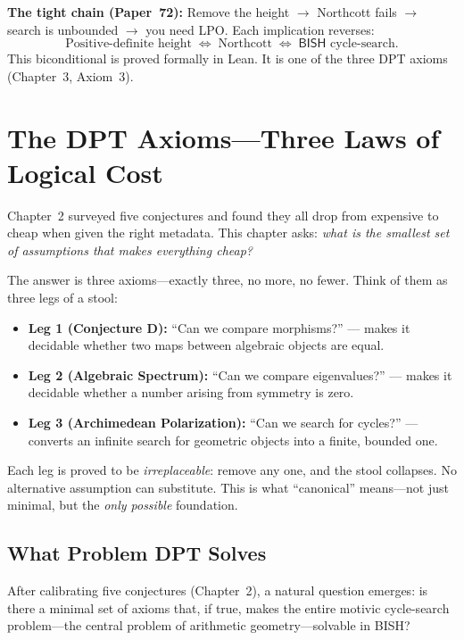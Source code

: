\documentclass[11pt,twoside,openany]{report}
\theoremstyle{remark}
\newcommand{\BISH}{\textsf{BISH}}
\newcommand{\LPO}{\textsf{LPO}}
\newcommand{\paperref}[1]{\textbf{Paper~#1}}
\begin{document}
\textbf{The tight chain (\paperref{72}):} Remove the height $\to$ Northcott fails $\to$ search is unbounded $\to$ you need \LPO. Each implication reverses:
\[
  \text{Positive-definite height} \;\Leftrightarrow\; \text{Northcott} \;\Leftrightarrow\; \BISH\text{ cycle-search}.
\]
This biconditional is proved formally in Lean. It is one of the three DPT axioms (Chapter~3, Axiom~3).


\chapter{The DPT Axioms---Three Laws of Logical Cost}

\begin{analogybox}
Chapter~2 surveyed five conjectures and found they all drop from expensive to cheap when given the right metadata. This chapter asks: \emph{what is the smallest set of assumptions that makes everything cheap?}

The answer is three axioms---exactly three, no more, no fewer. Think of them as three legs of a stool:
\begin{itemize}
  \item \textbf{Leg 1 (Conjecture D):} ``Can we compare morphisms?'' --- makes it decidable whether two maps between algebraic objects are equal.
  \item \textbf{Leg 2 (Algebraic Spectrum):} ``Can we compare eigenvalues?'' --- makes it decidable whether a number arising from symmetry is zero.
  \item \textbf{Leg 3 (Archimedean Polarization):} ``Can we search for cycles?'' --- converts an infinite search for geometric objects into a finite, bounded one.
\end{itemize}
Each leg is proved to be \emph{irreplaceable}: remove any one, and the stool collapses. No alternative assumption can substitute. This is what ``canonical'' means---not just minimal, but the \emph{only possible} foundation.
\end{analogybox}


\section{What Problem DPT Solves}

After calibrating five conjectures (Chapter~2), a natural question emerges: is there a minimal set of axioms that, if true, makes the entire motivic cycle-search problem---the central problem of arithmetic geometry---solvable in \BISH?
\end{document}
